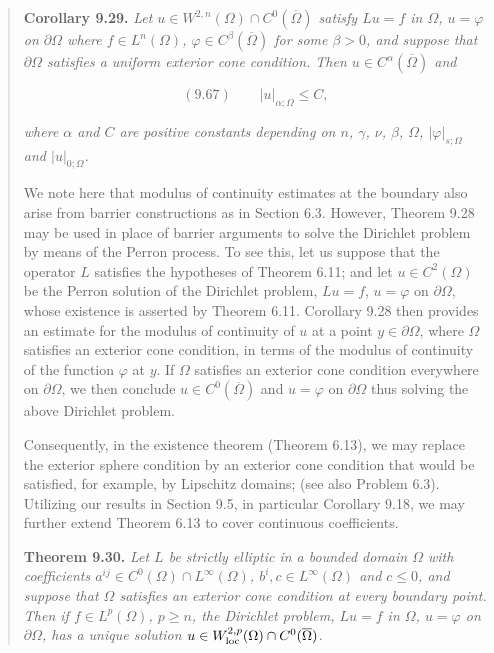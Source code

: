 \begin{quote}
\textbf{Corollary 9.29.} \emph{Let $u\in W^{2,n}(\Omega)\cap C^{0}(\overline{\Omega})$ satisfy $Lu=f$ in $\Omega$, $u=\varphi$ on $\partial\Omega$ where $f\in L^{n}(\Omega)$, $\varphi\in C^{\beta}(\overline{\Omega})$ for some $\beta>0$, and suppose that $\partial\Omega$ satisfies a uniform exterior cone condition. Then $u\in C^{\alpha}(\overline{\Omega})$ and}

\[
(9.67)\qquad |u|_{\alpha;\Omega}\le C,
\]

\emph{where $\alpha$ and $C$ are positive constants depending on $n$, $\gamma$, $\nu$, $\beta$, $\Omega$, $|\varphi|_{s;\Omega}$ and $|u|_{0;\Omega}$.}

We note here that modulus of continuity estimates at the boundary also arise from barrier constructions as in Section 6.3. However, Theorem 9.28 may be used in place of barrier arguments to solve the Dirichlet problem by means of the Perron process. To see this, let us suppose that the operator $L$ satisfies the hypotheses of Theorem 6.11; and let $u\in C^{2}(\Omega)$ be the Perron solution of the Dirichlet problem, $Lu=f$, $u=\varphi$ on $\partial\Omega$, whose existence is asserted by Theorem 6.11. Corollary 9.28 then provides an estimate for the modulus of continuity of $u$ at a point $y\in \partial\Omega$, where $\Omega$ satisfies an exterior cone condition, in terms of the modulus of continuity of the function $\varphi$ at $y$. If $\Omega$ satisfies an exterior cone condition everywhere on $\partial\Omega$, we then conclude $u\in C^{0}(\overline{\Omega})$ and $u=\varphi$ on $\partial\Omega$ thus solving the above Dirichlet problem.

Consequently, in the existence theorem (Theorem 6.13), we may replace the exterior sphere condition by an exterior cone condition that would be satisfied, for example, by Lipschitz domains; (see also Problem 6.3). Utilizing our results in Section 9.5, in particular Corollary 9.18, we may further extend Theorem 6.13 to cover continuous coefficients.

\medskip

\textbf{Theorem 9.30.} \emph{Let $L$ be strictly elliptic in a bounded domain $\Omega$ with coefficients $a^{ij}\in C^{0}(\Omega)\cap L^{\infty}(\Omega)$, $b^{i},c\in L^{\infty}(\Omega)$ and $c\le 0$, and suppose that $\Omega$ satisfies an exterior cone condition at every boundary point. Then if $f\in L^{p}(\Omega)$, $p\ge n$, the Dirichlet problem, $Lu=f$ in $\Omega$, $u=\varphi$ on $\partial\Omega$, has a unique solution $u\in W^{2,p}_{\mathrm{loc}}(\Omega)\cap C^{0}(\overline{\Omega})$.}


\end{quote}
